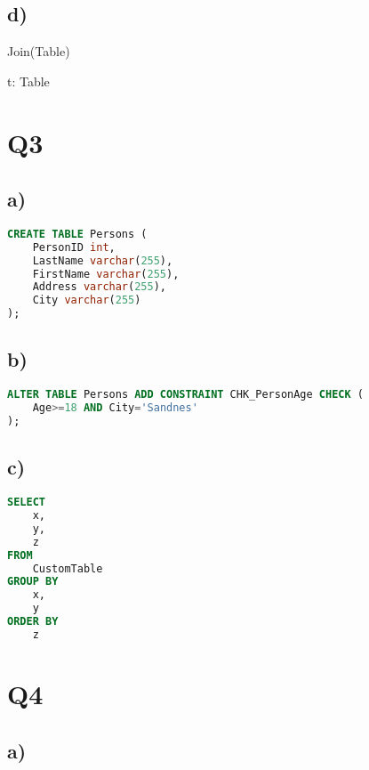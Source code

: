 \documentclass{article}
\begin{document}
\subsection*{\small d)}

\begin{zed}
Join(Table)
\end{zed}

\begin{zed}
\forall t: Table
\end{zed}

\section*{Q3}

\subsection*{\small a)}

\begin{lstlisting}[language=sql]
CREATE TABLE Persons (
    PersonID int,
    LastName varchar(255),
    FirstName varchar(255),
    Address varchar(255),
    City varchar(255)
);
\end{lstlisting}


\subsection*{\small b)}

\begin{lstlisting}[language=sql]
ALTER TABLE Persons ADD CONSTRAINT CHK_PersonAge CHECK (
    Age>=18 AND City='Sandnes'
);
\end{lstlisting}

\subsection*{\small c)}

\begin{lstlisting}[language=sql]
SELECT 
    x,
    y,
    z
FROM 
    CustomTable 
GROUP BY 
    x,
    y
ORDER BY
    z
\end{lstlisting}

\section*{Q4}

\subsection*{\small a)}
\end{document}
